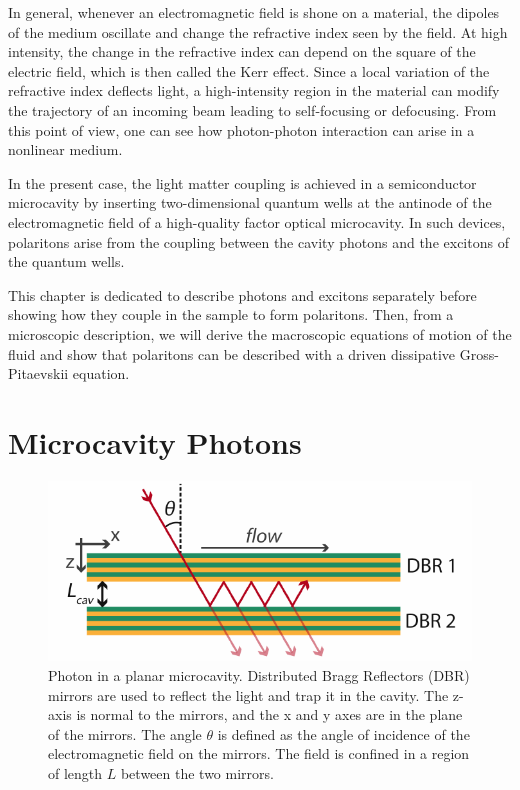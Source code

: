In general, whenever an electromagnetic field is shone on a material, the dipoles of the medium oscillate and change the refractive index seen by the field. At high intensity, the change in the refractive index can depend on the square of the electric field, which is then called the Kerr effect. Since a local variation of the refractive index deflects light, a high-intensity region in the material can modify the trajectory of an incoming beam leading to self-focusing or defocusing. From this point of view, one can see how photon-photon interaction can arise in a nonlinear medium.

In the present case, the light matter coupling is achieved in a semiconductor microcavity by inserting two-dimensional quantum wells at the antinode of the electromagnetic field of a high-quality factor optical microcavity. In such devices, polaritons arise from the coupling between the cavity photons and the excitons of the quantum wells.

This chapter is dedicated to describe photons and excitons separately before showing how they couple in the sample to form polaritons. Then, from a microscopic description, we will derive the macroscopic equations of motion of the fluid and show that polaritons can be described with a driven dissipative Gross-Pitaevskii equation.

\section{Microcavity Photons}

\label{sec:photon}

\begin{figure}[H]
    \centering
    \includegraphics[width=\textwidth]{chap_theory/fig/cavity_geometry.pdf}
    \caption{Photon in a planar microcavity. Distributed Bragg Reflectors (DBR) mirrors are used to reflect the light and trap it in the cavity. The z-axis is normal to the mirrors, and the x and y axes are in the plane of the mirrors. The angle $\theta$ is defined as the angle of incidence of the electromagnetic field on the mirrors. The field is confined in a region of length $L$ between the two mirrors.}
    \label{fig:cavity_geometry}
\end{figure}

